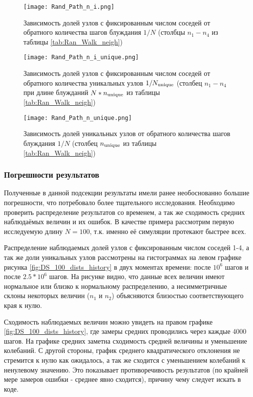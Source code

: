 \begin{figure}
    
\begin{minipage}{0.49\textwidth}
\centering
\texttt{[image: Rand\_Path\_n\_i.png]}
\caption{Зависимость долей узлов с фиксированным числом соседей от обратного количества шагов блуждания $1/N$  (столбцы $n_1-n_4$ из таблицы \ref{tab:Ran_Walk_neigh})}
\label{fig:DS_n_i}
\end{minipage}
\hfill
\begin{minipage}{0.49\textwidth}
\centering
\texttt{[image: Rand\_Path\_n\_i\_unique.png]}
\caption{Зависимость долей узлов с фиксированным числом соседей от обратного количества уникальных узлов $1/N_{\textup{unique}}$  (столбец  $n_1-n_4$ при длине блужданий $N * n_{\textup{unique}}$ из таблицы \ref{tab:Ran_Walk_neigh})}
\label{fig:DS_n_iu}
\end{minipage}
\centering
\texttt{[image: Rand\_Path\_n\_unique.png]}
\caption{Зависимость долей уникальных узлов от обратного количества шагов блуждания $1/N$ (столбец $n_{\textup{unique}}$ из таблицы \ref{tab:Ran_Walk_neigh})}
\label{fig:DS_n_u}
\end{figure} 

\newpage

\subsubsection{Погрешности результатов}

Полученные в данной подсекции результаты имели ранее необоснованно большие погрешности, что потребовало более тщательного исследования. 
Необходимо проверить распределение результатов со временем, а так же сходимость средних наблюдаёмых величин и их ошибок.
 В качестве примера рассмотрим первую исследуемую длину $N=100$, т.к. именно её симуляции протекают быстрее всех.  

Распределение наблюдаемых долей узлов с фиксированным числом соседей 1-4, а так же доли уникальных узлов рассмотрены на гистограммах на левом графике рисунка \ref{fig:DS_100_dists_history}  в двух моментах времени: после $10^6$ шагов и после $2.5 * 10^6$  шагов. 
На рисунке видно, что данные всех величин имеют нормальное или близко к нормальному распределению, а несимметричные склоны  некоторых величин ($n_1$ и $n_2$) объясняются близостью соответствующего края к нулю.

Сходимость наблюдаемых величин можно увидеть на правом графике \ref{fig:DS_100_dists_history}, где замеры средних проводились через каждые 4000 шагов. На графике средних заметна сходимость средней величины и уменьшение колебаний. 
С другой стороны, график среднего квадратического отклонения не стремится к нулю как ожидалось, а так же сходится с уменьшением колебаний к ненулевому значению. 
Это показывает противоречивость результатов (по крайней мере замеров ошибки - среднее явно сходится), причину чему следует искать в коде. 

